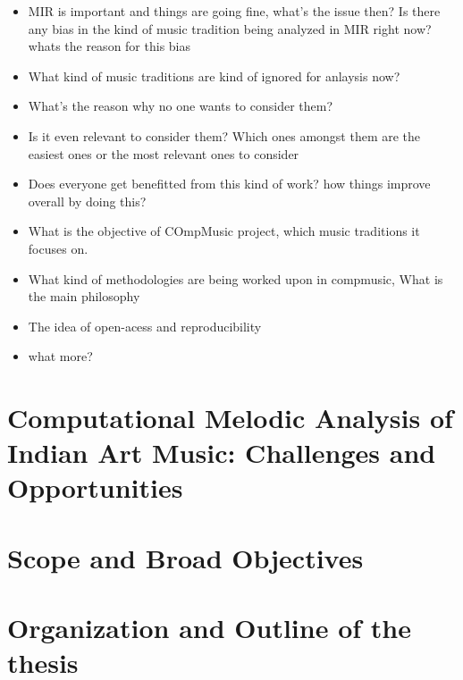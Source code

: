 \begin{itemize}
	\item MIR is important and things are going fine, what's the issue then? Is there any bias in the kind of music tradition being analyzed in MIR right now? whats the reason for this bias
	\item What kind of music traditions are kind of ignored for anlaysis now?
	\item What's the reason why no one wants to consider them?
	\item Is it even relevant to consider them? Which ones amongst them are the easiest ones or the most relevant ones to consider
	\item Does everyone get benefitted from this kind of work? how things improve overall by doing this?
	\item What is the objective of COmpMusic project, which music traditions it focuses on. 
	\item What kind of methodologies are being worked upon in compmusic, What is the main philosophy
	\item The idea of open-acess and reproducibility
	\item what more?
\end{itemize}

\section{Computational Melodic Analysis of Indian Art Music: Challenges and Opportunities}
\label{sec:intro_challenges_oppurtunities}

%
%

\section{Scope and Broad Objectives}
\label{sec:intro_scope_context_relevance}

\section{Organization and Outline of the thesis}
\label{sec:intro_organization}
